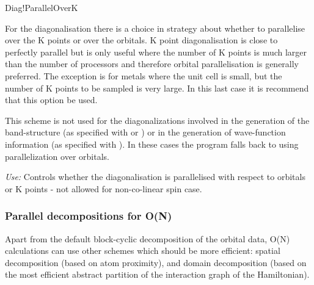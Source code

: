 \begin{fdflogicalF}{Diag!ParallelOverK}
  
  For the diagonalisation there is a choice in strategy about whether
  to parallelise over the K points or over the orbitals. K point
  diagonalisation is close to perfectly parallel but is only useful
  where the number of K points is much larger than the number of
  processors and therefore orbital parallelisation is generally
  preferred. The exception is for metals where the unit cell is small,
  but the number of K points to be sampled is very large. In this last
  case it is recommend that this option be used.

  \note This scheme is not used for the diagonalizations involved in
  the generation of the band-structure (as specified with
   or ) or in the generation of
  wave-function information (as specified with
  ). In these cases the program falls back to
  using parallelization over orbitals.

  \emph{Use:} Controls whether the diagonalisation is parallelised
  with respect to orbitals or K points - not allowed for non-co-linear
  spin case.

\end{fdflogicalF}


\subsubsection{Parallel decompositions for O(N)}
\label{parallel-on}

Apart from the default block-cyclic decomposition of the orbital data,
O(N) calculations can use other schemes which should be more
efficient: spatial decomposition (based on atom proximity), and domain
decomposition (based on the most efficient abstract partition of the
interaction graph of the Hamiltonian). 

